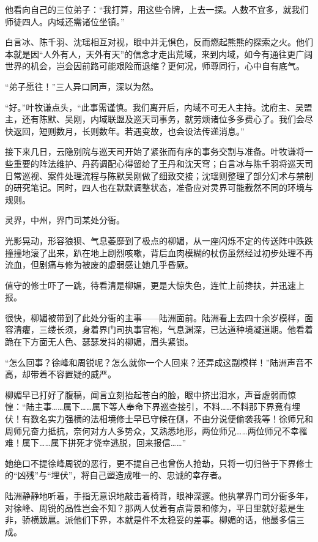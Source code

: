 他看向自己的三位弟子：“我打算，用这些令牌，上去一探。人数不宜多，就我们师徒四人。内域还需诸位坐镇。”

白言冰、陈千羽、沈瑶相互对视，眼中并无惧色，反而燃起熊熊的探索之火。他们本就是因“人外有人，天外有天”的信念才走出荒域，来到内域，如今有通往更广阔世界的机会，岂会因前路可能艰险而退缩？更何况，师尊同行，心中自有底气。

“弟子愿往！”三人异口同声，深以为然。

“好。”叶牧谦点头，“此事需谨慎。我们离开后，内域不可无人主持。沈府主、吴盟主，还有陈默、吴刚，内域联盟及巡天司事务，就劳烦诸位多多费心了。我们会尽快返回，短则数月，长则数年。若遇变故，也会设法传递消息。”

接下来几日，云隐别院与巡天司开始了紧张而有序的事务交割与准备。叶牧谦将一些重要的阵法维护、丹药调配心得留给了王丹和沈天穹；白言冰与陈千羽将巡天司日常巡视、案件处理流程与陈默吴刚做了细致交接；沈瑶则整理了部分幻术与禁制的研究笔记。同时，四人也在默默调整状态，准备应对灵界可能截然不同的环境与规则。

\vspace{2em}

灵界，中州，界门司某处分衙。

光影晃动，形容狼狈、气息萎靡到了极点的柳媚，从一座闪烁不定的传送阵中跌跌撞撞地滚了出来，趴在地上剧烈咳嗽，背后血肉模糊的杖伤虽然经过初步处理不再流血，但剧痛与修为被废的虚弱感让她几乎昏厥。

值守的修士吓了一跳，待看清是柳媚，更是大惊失色，连忙上前搀扶，并迅速上报。

很快，柳媚被带到了此处分衙的主事——陆洲面前。陆洲看上去四十余岁模样，面容清癯，三缕长须，身着界门司执事官袍，气息渊深，已达道种境凝道期。他看着跪在下方面无人色、瑟瑟发抖的柳媚，眉头紧锁。

“怎么回事？徐峰和周锐呢？怎么就你一个人回来？还弄成这副模样！”陆洲声音不高，却带着不容置疑的威严。

柳媚早已打好了腹稿，闻言立刻抬起苍白的脸，眼中挤出泪水，声音虚弱而惊惶：“陆主事……属下……属下等人奉命下界巡查接引，不料……不料那下界竟有埋伏！有数名实力强横的法相境修士早已守候在侧，不由分说便偷袭我等！徐师兄和周师兄奋力抵抗，奈何对方人多势众，又熟悉地形，两位师兄……两位师兄不幸罹难！属下……属下拼死才侥幸逃脱，回来报信……”

她绝口不提徐峰周锐的恶行，更不提自己也曾伤人抢劫，只将一切归咎于下界修士的“凶残”与“埋伏”，将自己塑造成唯一的、忠诚的幸存者。

陆洲静静地听着，手指无意识地敲击着椅背，眼神深邃。他执掌界门司分衙多年，对徐峰、周锐的品性岂会不知？那两人仗着有点背景和修为，平日里就好惹是生非，骄横跋扈。派他们下界，本就是件不太稳妥的差事。柳媚的话，他最多信三成。

